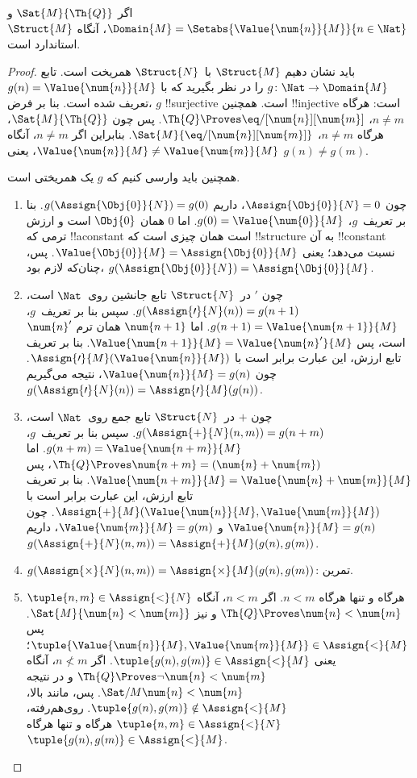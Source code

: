 \documentclass[../../../include/open-logic-section]{subfiles}
\begin{document}
\begin{prop}
اگر $\Sat{M}{\Th{Q}}$ و
$\Domain{M} = \Setabs{\Value{\num{n}}{M}}{n \in \Nat}$، آنگاه
$\Struct{M}$ استاندارد است.
\end{prop}

\begin{proof}
باید نشان دهیم $\Struct{M}$ با~$\Struct{N}$ همریخت است. تابع
$g\colon \Nat \to \Domain{M}$ را در نظر بگیرید که با
$g(n) = \Value{\num{n}}{M}$ تعریف شده است. بنا بر فرض، $g$
!!{surjective} است. همچنین !!{injective} است: هرگاه $n \neq m$،
$\Th{Q} \Proves \eq/[\num{n}][\num{m}]$. پس چون
$\Sat{M}{\Th{Q}}$، هرگاه $n \neq m$،
$\Sat{M}{\eq/[\num{n}][\num{m}]}$. بنابراین اگر $n \neq m$، آنگاه
$\Value{\num{n}}{M} \neq \Value{\num{m}}{M}$، یعنی
$g(n) \neq g(m)$.

همچنین باید وارسی کنیم که $g$ یک همریختی است.
\begin{enumerate}
\item چون $\Assign{\Obj{0}}{N} = 0$، داریم
  $g(\Assign{\Obj{0}}{N}) = g(0)$. بنا بر تعریف~$g$،
  $g(0) = \Value{\num{0}}{M}$. اما $\num{0}$ همان $\Obj{0}$ است و
  ارزش ترمی که !!a{constant} است همان چیزی است که !!{structure} به آن
  !!{constant} نسبت می‌دهد؛ یعنی
  $\Value{\Obj{0}}{M} = \Assign{\Obj{0}}{M}$. پس، چنان‌که لازم بود،
  $g(\Assign{\Obj{0}}{N}) = \Assign{\Obj{0}}{M}$.
\item چون $\prime$ در~$\Struct{N}$ تابع جانشین روی~$\Nat$ است،
  $g(\Assign{\prime}{N}(n)) = g(n+1)$. سپس بنا بر تعریف~$g$،
  $g(n+1) = \Value{\num{n+1}}{M}$. اما $\num{n+1}$ همان ترم
  $\num{n}'$ است، پس
  $\Value{\num{n+1}}{M} = \Value{\num{n}'}{M}$. بنا بر تعریف تابع
  ارزش، این عبارت برابر است با
  $\Assign{\prime}{M}(\Value{\num{n}}{M})$. چون
  $\Value{\num{n}}{M} = g(n)$، نتیجه می‌گیریم
  $g(\Assign{\prime}{N}(n)) = \Assign{\prime}{M}(g(n))$.
\item چون $+$ در~$\Struct{N}$ تابع جمع روی~$\Nat$ است،
  $g(\Assign{+}{N}(n,m)) = g(n+m)$. سپس بنا بر تعریف~$g$،
  $g(n+m) = \Value{\num{n+m}}{M}$. اما
  $\Th{Q} \Proves \num{n+m} = (\num{n} + \num{m})$، پس
  $\Value{\num{n+m}}{M} = \Value{\num{n}+\num{m}}{M}$. بنا بر
  تعریف تابع ارزش، این عبارت برابر است با
  $\Assign{+}{M}(\Value{\num{n}}{M},\Value{\num{m}}{M})$. چون
  $\Value{\num{n}}{M} = g(n)$ و $\Value{\num{m}}{M} = g(m)$، داریم
  $g(\Assign{+}{N}(n, m)) = \Assign{+}{M}(g(n), g(m))$.
\item $g(\Assign{\times}{N}(n, m)) =
  \Assign{\times}{M}(g(n), g(m))$: تمرین.
\item $\tuple{n,m} \in \Assign{<}{N}$ هرگاه و تنها هرگاه $n < m$.
  اگر $n < m$، آنگاه $\Th{Q} \Proves \num{n} < \num{m}$ و نیز
  $\Sat{M}{\num{n} < \num{m}}$. پس
  $\tuple{\Value{\num{n}}{M}, \Value{\num{m}}{M}} \in
  \Assign{<}{M}$؛ یعنی
  $\tuple{g(n), g(m)} \in \Assign{<}{M}$. اگر $n \not< m$، آنگاه
  $\Th{Q} \Proves \lnot \num{n} < \num{m}$ و در نتیجه
  $\Sat/{M}{\num{n} < \num{m}}$. پس، مانند بالا،
  $\tuple{g(n), g(m)} \notin \Assign{<}{M}$. روی‌هم‌رفته،
  $\tuple{n,m} \in \Assign{<}{N}$ هرگاه و تنها هرگاه
  $\tuple{g(n), g(m)} \in \Assign{<}{M}$.
\end{enumerate}
\end{proof}
\end{document}

